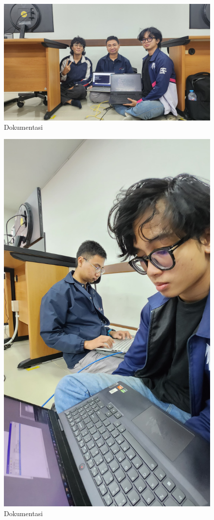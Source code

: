 \begin{figure}[H]
        \centering
        \includegraphics[width=0.5\linewidth]{gambar8.jpeg}
        \caption{Dokumentasi}
        \label{fig:gambar1}
    \end{figure}

    \begin{figure}[H]
        \centering
        \includegraphics[width=0.5\linewidth]{gambar9.jpeg}
        \caption{Dokumentasi}
        \label{fig:gambar1}
    \end{figure}

